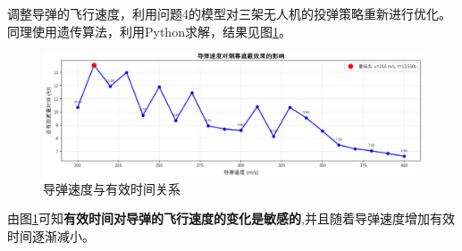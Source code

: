 \documentclass[../main.tex]{subfiles}
\begin{document}

调整导弹的飞行速度，利用问题4的模型对三架无人机的投弹策略重新进行优化。同理使用遗传算法，利用Python求解，结果见图\ref{Figure_1}。
\begin{figure}[H]
\centering
\includegraphics[scale=0.35]{灵敏度分析图.png}
\caption{导弹速度与有效时间关系}
\label{Figure_1}
\end{figure}
由图\ref{Figure_1}可知\textbf{有效时间对导弹的飞行速度的变化是敏感的},并且随着导弹速度增加有效时间逐渐减小。
\end{document}
